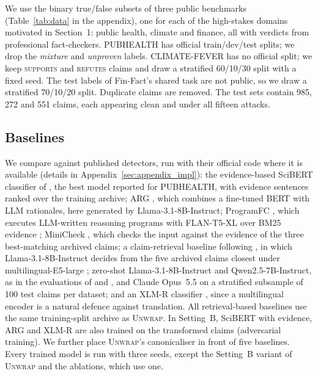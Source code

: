 \documentclass[11pt]{article}
\newcommand{\method}{\textsc{Unwrap}}
\begin{document}
We use the binary true/false subsets of three public benchmarks (Table~\ref{tab:data} in the appendix), one for each of the high-stakes domains motivated in Section~1: public health, climate and finance, all with verdicts from professional fact-checkers. PUBHEALTH \citep{kotonya2020pubhealth} has official train/dev/test splits; we drop the \emph{mixture} and \emph{unproven} labels. CLIMATE-FEVER \citep{diggelmann2020climatefever} has no official split; we keep \textsc{supports} and \textsc{refutes} claims and draw a stratified 60/10/30 split with a fixed seed. The test labels of Fin-Fact's \citep{rangapur2023finfact} shared task are not public, so we draw a stratified 70/10/20 split. Duplicate claims are removed. The test sets contain 985, 272 and 551 claims, each appearing clean and under all fifteen attacks.

\subsection{Baselines}

We compare against published detectors, run with their official code where it is available (details in Appendix~\ref{sec:appendix_impl}): the evidence-based SciBERT classifier of \citet{kotonya2020pubhealth}, the best model reported for PUBHEALTH, with evidence sentences ranked over the training archive; ARG \citep{hu2024arg}, which combines a fine-tuned BERT \citep{devlin2019bert} with LLM rationales, here generated by Llama-3.1-8B-Instruct; ProgramFC \citep{pan2023programfc}, which executes LLM-written reasoning programs with FLAN-T5-XL \citep{chung2024flan} over BM25 evidence \citep{robertson2009bm25}; MiniCheck \citep{tang2024minicheck}, which checks the input against the evidence of the three best-matching archived claims; a claim-retrieval baseline following \citet{pikuliak2023multiclaim}, in which Llama-3.1-8B-Instruct decides from the five archived claims closest under multilingual-E5-large \citep{wang2024me5}; zero-shot Llama-3.1-8B-Instruct and Qwen2.5-7B-Instruct, as in the evaluations of \citet{rangapur2023finfact} and \citet{chen2024llmmisinfo}, and Claude Opus~5.5 \citep{anthropic2026opus55} on a stratified subsample of 100 test claims per dataset; and an XLM-R classifier \citep{conneau2020xlmr}, since a multilingual encoder is a natural defence against translation. All retrieval-based baselines use the same training-split archive as \method{}. In Setting~B, SciBERT with evidence, ARG and XLM-R are also trained on the transformed claims (adversarial training). We further place \method{}'s canonicaliser in front of five baselines. Every trained model is run with three seeds, except the Setting~B variant of \method{} and the ablations, which use one.
\end{document}
